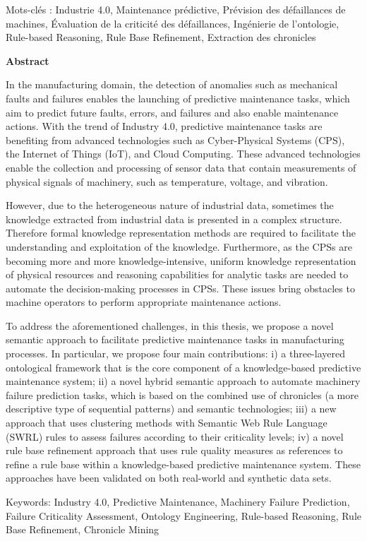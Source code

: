 Mots-clés : Industrie 4.0, Maintenance prédictive, Prévision des défaillances de machines, Évaluation de la criticité des défaillances, Ingénierie de l'ontologie, Rule-based Reasoning, Rule Base Refinement, Extraction des chronicles

\clearpage

\begin{center}
	\large \textbf{Abstract}
\end{center}

In the manufacturing domain, the detection of anomalies such as mechanical faults and failures enables the launching of predictive maintenance tasks, which aim to predict future faults, errors, and failures and also enable maintenance actions. With the trend of Industry 4.0, predictive maintenance tasks are benefiting from advanced technologies such as Cyber-Physical Systems (CPS), the Internet of Things (IoT), and Cloud Computing. These advanced technologies enable the collection and processing of sensor data that contain measurements of physical signals of machinery, such as temperature, voltage, and vibration.

However, due to the heterogeneous nature of industrial data, sometimes the knowledge extracted from industrial data is presented in a complex structure. Therefore formal knowledge representation methods are required to facilitate the understanding and exploitation of the knowledge. Furthermore, as the CPSs are becoming more and more knowledge-intensive, uniform knowledge representation of physical resources and reasoning capabilities for analytic tasks are needed to automate the decision-making processes in CPSs. These issues bring obstacles to machine operators to perform appropriate maintenance actions.

To address the aforementioned challenges, in this thesis, we propose a novel semantic approach to facilitate predictive maintenance tasks in manufacturing processes. In particular, we propose four main contributions: i) a three-layered ontological framework that is the core component of a knowledge-based predictive maintenance system; ii) a novel hybrid semantic approach to automate machinery failure prediction tasks, which is based on the combined use of chronicles (a more descriptive type of sequential patterns) and semantic technologies; iii) a new approach that uses clustering methods with Semantic Web Rule Language (SWRL) rules to assess failures according to their criticality levels; iv) a novel rule base refinement approach that uses rule quality measures as references to refine a rule base within a knowledge-based predictive maintenance system. These approaches have been validated on both real-world and synthetic data sets.

Keywords: Industry 4.0, Predictive Maintenance, Machinery Failure Prediction, Failure Criticality Assessment, Ontology Engineering, Rule-based Reasoning, Rule Base Refinement, Chronicle Mining


